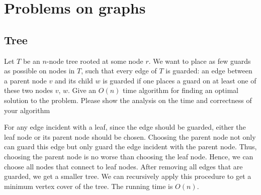\chapter{Problems on graphs}

\section{Tree}
\begin{Exercise}[title={Vertex cover on trees}, origin={NTUT CSIE 101}]
Let $T$ be an $n$-node tree rooted at some node $r$. We want to place as few guards as possible on nodes in $T$, such that every edge of $T$ is guarded: an edge between a parent node $v$ and its child $w$ is guarded if one places a guard on at least one of these two nodes $v$, $w$. Give an $O(n)$ time algorithm for finding an optimal solution to the problem. Please show the analysis on the time and correctness of your algorithm
\end{Exercise}
\begin{Answer}
For any edge incident with a leaf, since the edge should be guarded, either the leaf node or its parent node should be chosen. Choosing the parent node not only can guard this edge but only guard the edge incident with the parent node. Thus, choosing the parent node is no worse than choosing the leaf node. Hence, we can choose all nodes that connect to leaf nodes. After removing all edges that are guarded, we get a smaller tree. We can recursively apply this procedure to get a minimum vertex cover of the tree. The running time is $O(n)$.
\end{Answer}

